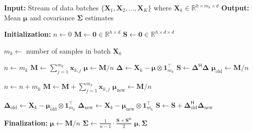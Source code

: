 \begin{algorithm}
\caption{Welford's Algorithm for Online Mean and Covariance Estimation}
\begin{algorithmic}[1]
\State \textbf{Input:} Stream of data batches $\{\mathbf{X}_1, \mathbf{X}_2, \ldots, \mathbf{X}_K\}$ where $\mathbf{X}_k \in \mathbb{R}^{h \times m_k \times d}$
\State \textbf{Output:} Mean $\boldsymbol{\mu}$ and covariance $\mathbf{\Sigma}$ estimates

\State \textbf{Initialization:}
\State $n \gets 0$ 
\State $\mathbf{M} \gets \mathbf{0} \in \mathbb{R}^{h \times d}$ 
\State $\mathbf{S} \gets \mathbf{0} \in \mathbb{R}^{h \times d \times d}$ 

\State
{} 
    \State $m_k \gets$ number of samples in batch $\mathbf{X}_k$
    
     
        \State $n \gets m_k$
        \State $\mathbf{M} \gets \sum_{j=1}^{m_k} \mathbf{x}_{k,j}$ 
        \State $\boldsymbol{\mu} \gets \mathbf{M} / n$
        \State $\mathbf{\Delta} \gets \mathbf{X}_k - \boldsymbol{\mu} \otimes \mathbf{1}_{m_k}^\top$ 
        \State $\mathbf{S} \gets \mathbf{\Delta}^\mathsf{H} \mathbf{\Delta}$
    \Else {}
        \State $\boldsymbol{\mu}_{\text{old}} \gets \mathbf{M} / n$ 
        
        \State $n \gets n + m_k$ 
        \State $\mathbf{M} \gets \mathbf{M} + \sum_{j=1}^{m_k} \mathbf{x}_{k,j}$ 
        \State $\boldsymbol{\mu}_{\text{new}} \gets \mathbf{M} / n$ 
        
        \State $\mathbf{\Delta}_{\text{old}} \gets \mathbf{X}_k - \boldsymbol{\mu}_{\text{old}} \otimes \mathbf{1}_{m_k}^\top$
        \State $\mathbf{\Delta}_{\text{new}} \gets \mathbf{X}_k - \boldsymbol{\mu}_{\text{new}} \otimes \mathbf{1}_{m_k}^\top$
        \State $\mathbf{S} \gets \mathbf{S} + \mathbf{\Delta}_{\text{old}}^\mathsf{H} \mathbf{\Delta}_{\text{new}}$ 
    \EndIf
\EndFor

\State
\State \textbf{Finalization:}
\State $\boldsymbol{\mu} \gets \mathbf{M} / n$ 
\State $\mathbf{\Sigma} \gets \frac{1}{n-1} \cdot \frac{\mathbf{S} + \mathbf{S}^\mathsf{H}}{2}$ 
\State \Return $\boldsymbol{\mu}, \mathbf{\Sigma}$
\end{algorithmic}
\label{alg:welford}
\end{algorithm}

